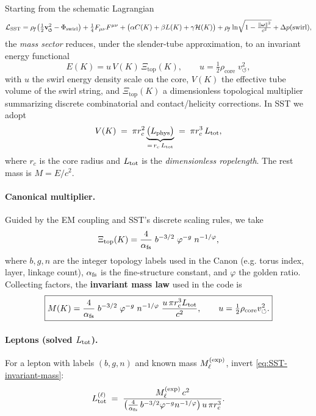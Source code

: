 \documentclass[11pt]{article}
\begin{document}
        Starting from the schematic Lagrangian
        \[
            \mathcal{L}_{\text{SST}}
            = \rhof\!\left(\tfrac{1}{2}\vswirl^2 - \Phi_{\text{swirl}}\right)
            + \tfrac{1}{4}F_{\mu\nu}F^{\mu\nu}
            + \big(\alpha C(K)+\beta L(K)+\gamma \mathcal{H}(K)\big)
            + \rhof \ln\!\sqrt{1-\tfrac{\|\boldsymbol\omega\|^2}{c^2}}
            + \Delta p(\text{swirl}),
        \]
        the \emph{mass sector} reduces, under the slender-tube approximation, to an invariant energy functional
        \[
            E(K)= u\,V(K)\,\Xi_{\text{top}}(K),\qquad
            u=\tfrac{1}{2}\rho_{\text{core}}\;v_{\circlearrowleft}^{2},
        \]
        with $u$ the swirl energy density scale on the core, $V(K)$ the effective tube volume of the swirl string, and $\Xi_{\text{top}}(K)$ a dimensionless topological multiplier summarizing discrete combinatorial and contact/helicity corrections. In SST we adopt
        \[
            V(K)\;=\;\pi r_c^2 \underbrace{\big(L_{\rm phys}\big)}_{=\,r_c\,L_{\rm tot}}
            \;=\;\pi r_c^3\,L_{\rm tot},
        \]
        where $r_c$ is the core radius and $L_{\rm tot}$ is the \emph{dimensionless ropelength}. The rest mass is $M=E/c^2$.

        \paragraph{Canonical multiplier.}
            Guided by the EM coupling and SST’s discrete scaling rules, we take
            \[
                \Xi_{\text{top}}(K)=\frac{4}{\alpha_{\rm fs}}\;b^{-3/2}\;\varphi^{-g}\;n^{-1/\varphi},
            \]
            where $b,g,n$ are the integer topology labels used in the Canon (e.g. torus index, layer, linkage count), $\alpha_{\rm fs}$ is the fine-structure constant, and $\varphi$ the golden ratio. Collecting factors, the \textbf{invariant mass law} used in the code is
            \begin{equation*}
                \boxed{M(K)=\frac{4}{\alpha_{\rm fs}}\;b^{-3/2}\;\varphi^{-g}\;n^{-1/\varphi}\;
                \frac{u\,\pi r_c^3 L_{\rm tot}}{c^2},
                    \qquad
                    u=\tfrac{1}{2}\rho_{\text{core}}v_{\circlearrowleft}^2.
                    }\label{eq:SST-invariant-mass}
            \end{equation*}

        \paragraph{Leptons (solved $L_{\rm tot}$).}
            For a lepton with labels $(b,g,n)$ and known mass $M_\ell^{\rm(exp)}$, invert \eqref{eq:SST-invariant-mass}:
            \[
                L_{\rm tot}^{(\ell)} \;=\;
                \frac{M_\ell^{\rm(exp)}\,c^2}{\big(\tfrac{4}{\alpha_{\rm fs}}\,b^{-3/2}\varphi^{-g}n^{-1/\varphi}\big)\,u\,\pi r_c^3}.
            \]
\end{document}
